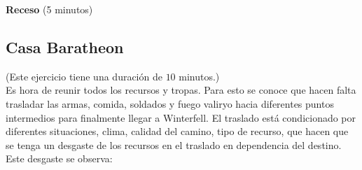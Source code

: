 \documentclass[a4paper,10pt,twocolumn]{article}
\theoremstyle{theorem}
\theoremstyle{definition}
\theoremstyle{remark}
\begin{document}
\textbf{Receso} (5 minutos)

	\subsection{Casa Baratheon}\label{subsec:ejer_4}
(Este ejercicio tiene una duración de $10$ minutos.)\\

Es hora de reunir todos los recursos y tropas. Para esto se conoce que hacen falta trasladar las armas, comida, soldados y fuego valiryo hacia diferentes puntos intermedios para finalmente llegar a Winterfell. El traslado está condicionado por diferentes situaciones, clima, calidad del camino, tipo de recurso, que hacen que se tenga un desgaste de los recursos en el traslado en dependencia del destino. Este desgaste se observa:
\end{document}
